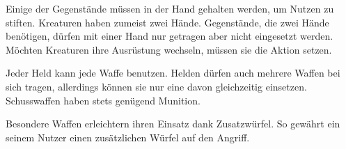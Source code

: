 {		Einige der Gegenstände müssen in der Hand gehalten werden, um Nutzen zu stiften. Kreaturen haben zumeist zwei Hände. Gegenstände, die zwei Hände benötigen, dürfen mit einer Hand nur getragen aber nicht eingesetzt werden. Möchten Kreaturen ihre Ausrüstung wechseln, müssen sie die Aktion  setzen.

			Jeder Held kann jede Waffe benutzen. Helden dürfen auch mehrere Waffen bei sich tragen, allerdings können sie nur eine davon gleichzeitig einsetzen. Schusswaffen haben stets genügend Munition.


			\noindent
			Besondere Waffen erleichtern ihren Einsatz dank Zusatzwürfel. So gewährt ein  seinem Nutzer einen zusätzlichen Würfel auf den Angriff.


}
